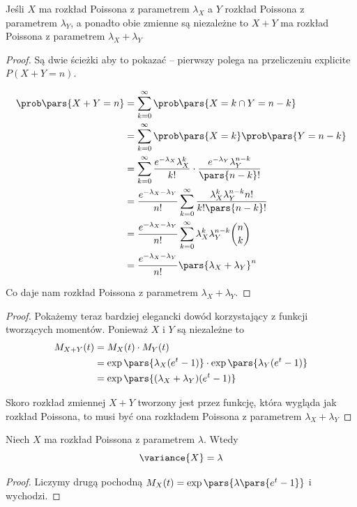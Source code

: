 \begin{theorem}[Lemat 5.2 P\&C]
	Jeśli \( X \) ma rozkład Poissona z parametrem \( \lambda_X \) a \( Y \) rozkład Poissona z parametrem \( \lambda_Y \), a ponadto obie zmienne są niezależne to \( X + Y \) ma rozkład Poissona z parametrem \( \lambda_X + \lambda_Y\)
\end{theorem}
\begin{proof}
	Są dwie ścieżki aby to pokazać -- pierwszy polega na przeliczeniu explicite \( P(X + Y = n) \).

	\begin{align*}
		\prob\pars{X+Y=n} & = \sum_{k=0}^{\infty}\prob\pars{X = k \cap Y = n-k}                                                             \\
		                  & = \sum_{k=0}^{\infty}\prob\pars{X = k}\prob\pars{Y = n-k}                                                       \\
		                  & = \sum_{k=0}^{\infty}\frac{e^{-\lambda_X}\lambda_X^k}{k!}\cdot\frac{e^{-\lambda_Y}\lambda_Y^{n-k}}{\pars{n-k}!} \\
		                  & = \frac{e^{-\lambda_X-\lambda_Y}}{n!}\sum_{k=0}^{\infty}\frac{\lambda_X^k\lambda_Y^{n-k}n!}{k!\pars{n-k}!}      \\
		                  & = \frac{e^{-\lambda_X-\lambda_Y}}{n!}\sum_{k=0}^{\infty}\lambda_X^k\lambda_Y^{n-k}\binom{n}{k}                  \\
		                  & = \frac{e^{-\lambda_X-\lambda_Y}}{n!}\pars{\lambda_X+\lambda_Y}^n
	\end{align*}

	Co daje nam rozkład Poissona z parametrem \(\lambda_X + \lambda_Y\).
\end{proof}
\begin{proof}
	Pokażemy teraz bardziej elegancki dowód korzystający z funkcji tworzących momentów.
	Ponieważ \( X \) i \( Y \) są niezależne to
	\begin{align*}
		M_{X + Y}(t)
		 & = M_X(t) \cdot M_Y(t)                                               \\
		 & = \exp\pars{\lambda_X(e^t - 1)} \cdot \exp\pars{\lambda_Y(e^t - 1)} \\
		 & = \exp\pars{(\lambda_X + \lambda_Y)(e^t - 1)}
	\end{align*}

	Skoro rozkład zmiennej \( X + Y \) tworzony jest przez funkcję, która wygląda jak rozkład Poissona, to musi być ona rozkładem Poissona z parametrem \( \lambda_X + \lambda_Y \)
\end{proof}
\begin{theorem}
	\label{poisson-variable-variance}
	Niech \( X \) ma rozkład Poissona z parametrem \( \lambda \). Wtedy
	\[
		\variance{X} = \lambda
	\]
\end{theorem}
\begin{proof}
	Liczymy drugą pochodną \( M_X(t) = \exp\pars{\lambda \pars{e^t - 1}} \) i wychodzi.
\end{proof}